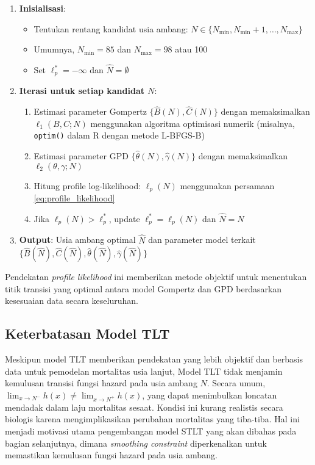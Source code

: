 \begin{enumerate}
    \item \textbf{Inisialisasi}:
    \begin{itemize}
        \item Tentukan rentang kandidat usia ambang: $N \in \{N_{\min}, N_{\min} + 1, \ldots, N_{\max}\}$
        \item Umumnya, $N_{\min} = 85$ dan $N_{\max} = 98$ atau 100
        \item Set $\ell_p^* = -\infty$ dan $\hat{N} = \emptyset$
    \end{itemize}
    
    \item \textbf{Iterasi untuk setiap kandidat $N$}:
    \begin{enumerate}
        \item Estimasi parameter Gompertz $\{\hat{B}(N), \hat{C}(N)\}$ dengan memaksimalkan $\ell_1(B, C; N)$ menggunakan algoritma optimisasi numerik (misalnya, \texttt{optim()} dalam R dengan metode L-BFGS-B)
        
        \item Estimasi parameter GPD $\{\hat{\theta}(N), \hat{\gamma}(N)\}$ dengan memaksimalkan $\ell_2(\theta, \gamma; N)$
        
        \item Hitung profile log-likelihood: $\ell_p(N)$ menggunakan persamaan \eqref{eq:profile_likelihood}
        
        \item Jika $\ell_p(N) > \ell_p^*$, update $\ell_p^* = \ell_p(N)$ dan $\hat{N} = N$
    \end{enumerate}
    
    \item \textbf{Output}: Usia ambang optimal $\hat{N}$ dan parameter model terkait $\{\hat{B}(\hat{N}), \hat{C}(\hat{N}), \hat{\theta}(\hat{N}), \hat{\gamma}(\hat{N})\}$
\end{enumerate}

Pendekatan \textit{profile likelihood} ini memberikan metode objektif untuk menentukan titik transisi yang optimal antara model Gompertz dan GPD berdasarkan kesesuaian data secara keseluruhan.

\subsection{Keterbatasan Model TLT}

Meskipun model TLT memberikan pendekatan yang lebih objektif dan berbasis data untuk pemodelan mortalitas usia lanjut, Model TLT tidak menjamin kemulusan transisi fungsi hazard pada usia ambang $N$. Secara umum, $\lim_{x \to N^-} h(x) \neq \lim_{x \to N^+} h(x)$, yang dapat menimbulkan loncatan mendadak dalam laju mortalitas sesaat. Kondisi ini kurang realistis secara biologis karena mengimplikasikan perubahan mortalitas yang tiba-tiba. Hal ini menjadi motivasi utama pengembangan model STLT yang akan dibahas pada bagian selanjutnya, dimana \textit{smoothing constraint} diperkenalkan untuk memastikan kemulusan fungsi hazard pada usia ambang.

